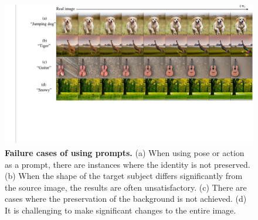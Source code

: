 \begin{figure}[!h]
    \centering
    \includegraphics[width=1.0\linewidth]{figure/more_limitations.pdf}
    \caption{
    \textbf{Failure cases of using prompts.} (a) When using pose or action as a prompt, there are instances where the identity is not preserved.
(b) When the shape of the target subject differs significantly from the source image, the results are often unsatisfactory.
(c) There are cases where the preservation of the background is not achieved.
(d) It is challenging to make significant changes to the entire image.}
    \label{fig:more_limitations}
\end{figure}




